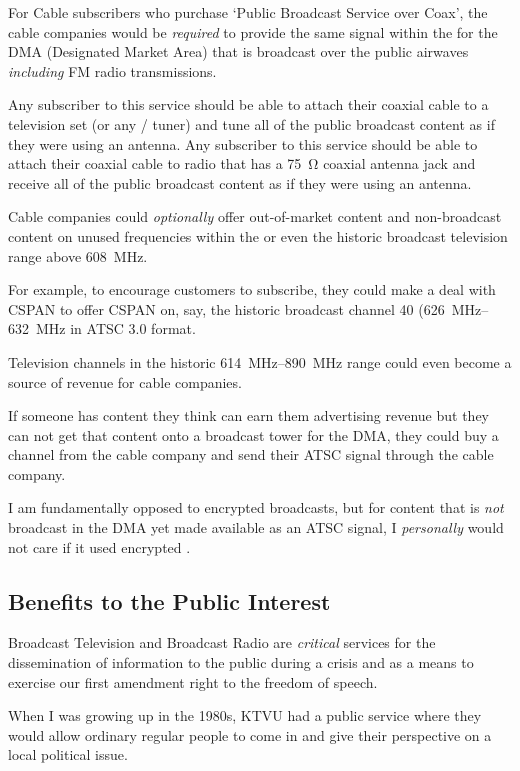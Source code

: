 For Cable subscribers who purchase `Public Broadcast Service over Coax', the cable companies
would be \emph{required} to provide the same signal within the \atscrange{} for the DMA (Designated
Market Area) that is broadcast over the public airwaves \emph{including} FM radio transmissions.

Any subscriber to this service should be able to attach their coaxial cable to a television set (or
any / tuner) and tune all of the public broadcast content as if they were using
an antenna. Any subscriber to this service should be able to attach their coaxial cable to radio
that has a \SI{75}{\ohm} coaxial antenna jack and receive all of the public broadcast content as if
they were using an antenna.

Cable companies could \emph{optionally} offer out-of-market content and non-broadcast content on
unused frequencies within the \atscrange{} or even the historic broadcast television range above
\SI{608}{\mega\hertz}.

For example, to encourage customers to subscribe, they could make a deal with CSPAN to offer
CSPAN on, say, the historic broadcast channel 40 (\SIrange{626}{632}{\mega\hertz} in ATSC 3.0
format.

Television channels in the historic \SIrange{614}{890}{\mega\hertz} range could even become a
source of revenue for cable companies.

If someone has content they think can earn them advertising revenue but they can not get that
content onto a broadcast tower for the DMA, they could buy a channel from the cable company and
send their ATSC signal through the cable company.

I am fundamentally opposed to encrypted broadcasts, but for content that is \emph{not} broadcast
in the DMA yet made available as an ATSC signal, I \emph{personally} would not care if it used
encrypted .

\subsection{Benefits to the Public Interest}

Broadcast Television and Broadcast Radio are \emph{critical} services for the dissemination of
information to the public during a crisis and as a means to exercise our first amendment right to
the freedom of speech.

When I was growing up in the 1980s, KTVU had a public service where they would allow ordinary
regular people to come in and give their perspective on a local political issue.


